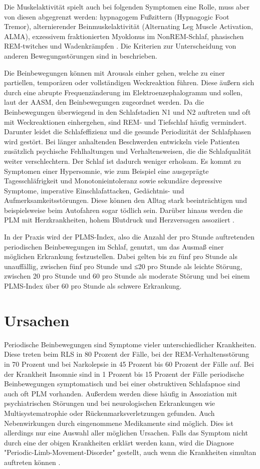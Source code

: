 Die Muskelaktivität spielt auch bei folgenden Symptomen eine Rolle, muss aber von diesen abgegrenzt werden: hypnagogem Fußzittern (Hypnagogic Foot Tremor), alternierender Beinmuskelaktivität (Alternating Leg Muscle Activation, ALMA), exzessivem fraktionierten Myoklonus im NonREM-Schlaf, phasischen REM-twitches und Wadenkrämpfen \cite{PDS}. Die Kriterien zur Unterscheidung von anderen Bewegungsstörungen sind in \cite{AASM} beschrieben.

Die Beinbewegungen können mit Arousals einher gehen, welche zu einer partiellen, temporären oder vollständigen Weckreaktion führen. Diese äußern sich durch eine abrupte Frequenzänderung im Elektroenzephalogramm und sollen, laut der AASM, den Beinbewegungen zugeordnet werden. Da die Beinbewegungen überwiegend in den Schlafstadien N1 und N2 auftreten und oft mit Weckreaktionen einhergehen, sind REM- und Tiefschlaf häufig vermindert. Darunter leidet die Schlafeffizienz und die gesunde Periodizität der Schlafphasen wird gestört. Bei länger anhaltenden Beschwerden entwickeln viele Patienten zusätzlich psychische Fehlhaltungen und Verhaltensweisen, die die Schlafqualität weiter verschlechtern. Der Schlaf ist dadurch weniger erholsam. Es kommt zu Symptomen einer Hypersomnie, wie zum Beispiel eine ausgeprägte Tagesschläfrigkeit und Monotonieintoleranz sowie sekundäre depressive Symptome, imperative Einschlafattacken, Gedächtnis- und Aufmerksamkeitsstörungen. Diese können den Alltag stark beeinträchtigen und beispielsweise beim Autofahren sogar tödlich sein. Darüber hinaus werden die PLM mit Herzkrankheiten, hohem Blutdruck und Herzversagen assoziiert \cite{Huang}. \cite{PDS}

In der Praxis wird der PLMS-Index, also die Anzahl der pro Stunde auftretenden periodischen Beinbewegungen im Schlaf, genutzt, um das Ausmaß einer möglichen Erkrankung festzustellen. Dabei gelten bis zu fünf pro Stunde als unauffällig, zwischen fünf pro Stunde und ≤20 pro Stunde als leichte Störung, zwischen 20 pro Stunde und 60 pro Stunde als moderate Störung und bei einem PLMS-Index über 60 pro Stunde als schwere Erkrankung. \cite{PDS}


\section{Ursachen}
Periodische Beinbewegungen sind Symptome vieler unterschiedlicher Krankheiten. Diese treten beim \gls{RLS} in 80 Prozent der Fälle, bei der REM-Verhaltensstörung in 70 Prozent und bei Narkolepsie in 45 Prozent bis 60 Prozent der Fälle auf. Bei der Krankheit Insomnie sind in 1 Prozent bis 15 Prozent der Fälle periodische Beinbewegungen symptomatisch und bei einer obstruktiven Schlafapnoe sind auch oft PLM vorhanden. Außerdem werden diese häufig in Assoziation mit psychiatrischen Störungen und bei neurologischen Erkrankungen wie Multisystematrophie oder Rückenmarksverletzungen gefunden. Auch Nebenwirkungen durch eingenommene Medikamente sind möglich. Dies ist allerdings nur eine Auswahl aller möglichen Ursachen. Falls das Symptom nicht durch eine der obigen Krankheiten erklärt werden kann, wird die Diagnose "Periodic-Limb-Movement-Disorder" gestellt, auch wenn die Krankheiten simultan auftreten können \cite{1x1}. \cite{PDS}


